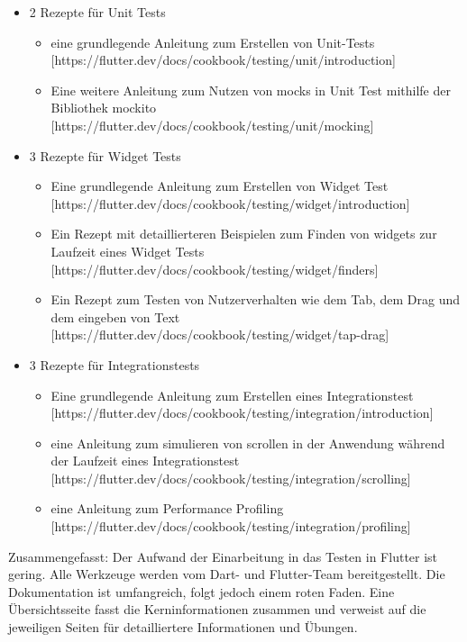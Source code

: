 \begin{itemize}
    \item 2 Rezepte für Unit Tests
    \begin{itemize} 
       \item eine grundlegende Anleitung zum Erstellen von Unit-Tests [https://flutter.dev/docs/cookbook/testing/unit/introduction]
       \item Eine weitere Anleitung zum Nutzen von mocks in Unit Test mithilfe der Bibliothek mockito [https://flutter.dev/docs/cookbook/testing/unit/mocking]
    \end{itemize}
    \item 3 Rezepte für Widget Tests
    \begin{itemize} 
        \item Eine grundlegende Anleitung zum Erstellen von Widget Test [https://flutter.dev/docs/cookbook/testing/widget/introduction]
        \item Ein Rezept mit detaillierteren Beispielen zum Finden von widgets  zur Laufzeit eines Widget Tests [https://flutter.dev/docs/cookbook/testing/widget/finders]
        \item Ein Rezept zum Testen von Nutzerverhalten wie dem Tab, dem Drag und dem eingeben von Text [https://flutter.dev/docs/cookbook/testing/widget/tap-drag]
     \end{itemize}
    \item 3 Rezepte für Integrationstests
    \begin{itemize} 
        \item Eine grundlegende Anleitung zum Erstellen eines Integrationstest [https://flutter.dev/docs/cookbook/testing/integration/introduction]
        \item eine Anleitung zum simulieren von scrollen in der Anwendung während der Laufzeit eines Integrationstest [https://flutter.dev/docs/cookbook/testing/integration/scrolling]
        \item eine Anleitung zum Performance Profiling [https://flutter.dev/docs/cookbook/testing/integration/profiling]
     \end{itemize}
\end{itemize}

Zusammengefasst: Der Aufwand der Einarbeitung in das Testen in Flutter ist gering. Alle Werkzeuge werden vom Dart- und Flutter-Team bereitgestellt. Die Dokumentation ist umfangreich, folgt jedoch einem roten Faden. Eine Übersichtsseite fasst die Kerninformationen zusammen und verweist auf die jeweiligen  Seiten für detailliertere Informationen und Übungen.